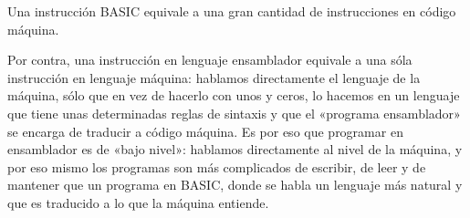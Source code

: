 \documentclass[letterpaper,10pt,spanish]{sphinxmanual}
\begin{document}
Una instrucción BASIC equivale a una gran cantidad de instrucciones en código máquina.

Por contra, una instrucción en lenguaje ensamblador equivale a una sóla instrucción en lenguaje máquina: hablamos directamente el lenguaje de la máquina, sólo que en vez de hacerlo con unos y ceros, lo hacemos en un lenguaje que tiene unas determinadas reglas de sintaxis y que el «programa ensamblador» se encarga de traducir a código máquina. Es por eso que programar en ensamblador es de «bajo nivel»: hablamos directamente al nivel de la máquina, y por eso mismo los programas son más complicados de escribir, de leer y de mantener que un programa en BASIC, donde se habla un lenguaje más natural y que es traducido a lo que la máquina entiende.

\begin{sphinxVerbatim}[commandchars=\\\{\}]

                      
                    
         
          
         
                
                         
\end{sphinxVerbatim}
\end{document}
